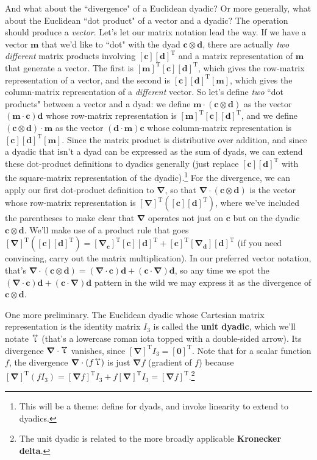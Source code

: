 \documentclass[12pt]{article}
\renewcommand{\vv}[1]{\mathbf{#1}}
\newcommand{\del}{\boldsymbol{\nabla}}
\newcommand{\tightoverset}[2]{%
  \mathop{#2}\limits^{\vbox to -.5ex{\kern-0.75ex\hbox{$#1$}\vss}}}
\newcommand{\inlinedy}[1]{\tightoverset{\text{\tiny$\bm\leftrightarrow$}}{#1}}
\begin{document}
And what about the ``divergence" of a Euclidean dyadic? Or more generally, what about the Euclidean ``dot product" of a vector and a dyadic? The operation should produce a \emph{vector}. Let's let our matrix notation lead the way. If we have a vector $\vv m$ that we'd like to ``dot" with the dyad $\vv c \otimes \vv d$, there are actually \emph{two different} matrix products involving $[\vv c][\vv d]^{\textrm{T}}$ and a matrix representation of $\vv m$ that generate a vector. The first is $[\vv m]^{\mathrm{T}}[\vv c][\vv d]^{\textrm{T}}$, which gives the row-matrix representation of a vector, and the second is $[\vv c][\vv d]^{\textrm{T}}[\vv m]$, which gives the column-matrix representation of a \emph{different} vector. So let's define \emph{two} ``dot products" between a vector and a dyad: we define $\vv m \cdot (\vv c \otimes \vv d)$ as the vector $(\vv m \cdot \vv c) \vv d$ whose row-matrix representation is $[\vv m]^{\mathrm{T}}[\vv c][\vv d]^{\textrm{T}}$, and we define $(\vv c \otimes \vv d) \cdot \vv m$ as the vector $(\vv d \cdot \vv m) \vv c$ whose column-matrix representation is $[\vv c][\vv d]^{\textrm{T}}[\vv m]$. Since the matrix product is distributive over addition, and since a dyadic that isn't a dyad can be expressed as the sum of dyads, we can extend these dot-product definitions to dyadics generally (just replace $[\vv c][\vv d]^{\textrm{T}}$ with the square-matrix representation of the dyadic).\footnote{This will be a theme: define for dyads, and invoke linearity to extend to dyadics.} For the divergence, we can apply our first dot-product definition to $\del$, so that $\del \cdot (\vv c \otimes \vv d)$ is the vector whose row-matrix representation is $[\del]^{\textrm{T}}([\vv c][\vv d]^{\textrm{T}})$, where we've included the parentheses to make clear that $\del$ operates not just on $\vv c$ but on the dyadic $\vv c \otimes \vv d$. We'll make use of a product rule that goes $[\del]^{\textrm{T}}([\vv c][\vv d]^{\textrm{T}}) = [\del_{\vv c}]^{\textrm{T}}[\vv c][\vv d]^{\textrm{T}} + [\vv c]^{\textrm{T}}[\del_{\vv d}][\vv d]^{\textrm{T}}$ (if you need convincing, carry out the matrix multiplication). In our preferred vector notation, that's $\del \cdot (\vv c \otimes \vv d) = (\del \cdot \vv c) \vv d + (\vv c \cdot \del) \vv d$, so any time we spot the $(\del \cdot \vv c) \vv d + (\vv c \cdot \del) \vv d$ pattern in the wild we may express it as the divergence of $\vv c \otimes \vv d$.

One more preliminary. The Euclidean dyadic whose Cartesian matrix representation is the identity matrix $I_3$ is called the \textbf{unit dyadic}, which we'll notate $\inlinedy{\upiota}$ (that's a lowercase roman iota topped with a double-sided arrow). Its divergence $\del \cdot \inlinedy{\upiota}$ vanishes, since $[\del]^{\textrm{T}}I_3 = [\vv 0]^{\textrm{T}}$. Note that for a scalar function $f$, the divergence $\del \cdot (f \mkern-2mu \inlinedy{\upiota})$ is just $\del f$ (gradient of $f$) because ${[\del]^{\textrm{T}}(f I_3) = [\del f]^{\textrm{T}} I_3 + f [\del]^{\textrm{T}} I_3 = [\del f]^{\textrm{T}}}$.\footnote{The unit dyadic is related to the more broadly applicable \textbf{Kronecker delta}.}
\end{document}
